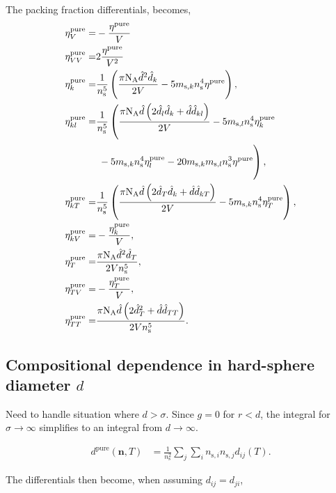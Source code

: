 \documentclass[english]{../thermomemo/thermomemo}
\newcommand*{\lb}{\left(}
\newcommand*{\rb}{\right)}
\newcommand{\hs}{\text{HS}\xspace}
\newcommand{\seg}{\ensuremath{\text{s}}\xspace}
\newcommand{\mbn}{\ensuremath{\mathbf{n}}\xspace}
\newcommand{\pure}{\ensuremath{\text{pure}}\xspace}
\newcommand{\NA}{\ensuremath{\text{N}_{\text{A}}}\xspace}
\begin{document}
The packing fraction differentials, becomes,
\begin{align}
  \label{eq:eta_BH_pure_ms_diff}
  \eta^{\pure}_V =& -\frac{\eta^{\pure}}{V} \\
  \eta^{\pure}_{VV} =& 2\frac{\eta^{\pure}}{V^2} \\
  \eta^{\pure}_k =& \frac{ 1}{n_\seg^5}\lb \frac{ \pi \NA \hat{d}^2 \hat{d}_k }{2 V} - 5 m_{\seg,k} n_\seg^4 \eta^{\pure} \rb,\\
  \eta^{\pure}_{kl} =& \frac{ 1}{n_\seg^5}\lb \frac{ \pi \NA \hat{d} \lb 2\hat{d}_l\hat{d}_k + \hat{d}\hat{d}_{kl}\rb}{2 V} - 5 m_{\seg,l} n_\seg^4 \eta^{\pure}_k \right. \nonumber \\ &\left. \vphantom{\frac{ \pi \NA \hat{d} \lb 2\hat{d}_l\hat{d}_k + \hat{d}\hat{d}_{kl}\rb}{2 V}} - 5 m_{\seg,k} n_\seg^4 \eta^{\pure}_l - 20 m_{\seg,k} m_{\seg,l}n_\seg^3 \eta^{\pure} \rb,\\
  \eta^{\pure}_{kT} =& \frac{ 1}{n_\seg^5}\lb \frac{ \pi \NA \hat{d}\lb 2 \hat{d}_T \hat{d}_k + \hat{d}\hat{d}_{kT} \rb}{2 V} - 5 m_{\seg,k} n_\seg^4 \eta^{\pure}_T \rb,\\
  \eta^{\pure}_{kV} =& -\frac{\eta^{\pure}_k}{V},\\
  \eta^{\pure}_T =& \frac{ \pi \NA \hat{d}^2 \hat{d}_{T} }{2 V n_\seg^5}, \\
  \eta^{\pure}_{TV} =& -\frac{\eta^{\pure}_T}{V}, \\
  \eta^{\pure}_{TT} =& \frac{ \pi \NA \hat{d} \lb 2  \hat{d}_{T}^2 + \hat{d}\hat{d}_{TT}\rb}{2 V n_\seg^5}.
\end{align}

\subsection{Compositional dependence in hard-sphere diameter $d$}

Need to handle situation where $d > \sigma$. Since $g=0$ for $r < d$,
the integral for $\sigma \rightarrow \infty$ simplifies to an integral
from $d \rightarrow \infty$.

\begin{align}
  \label{eq:d_pure_ms}
  d^{\pure} \lb \mbn, T\rb &=  \frac{1}{n_\seg^2}\sum_j \sum_i n_{\seg,i} n_{\seg,j} d_{ij} \lb T \rb.
\end{align}

The differentials then become, when assuming $d_{ij} = d_{ji}$,
\end{document}
